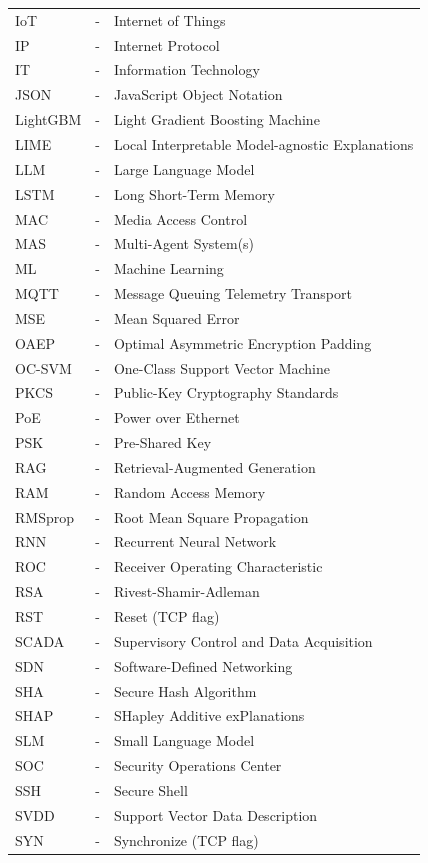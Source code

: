 \begin{longtable}{lcl}
IoT	& - & Internet of Things\\
IP	& - & Internet Protocol\\
IT	& - & Information Technology\\
JSON	& - & JavaScript Object Notation\\
LightGBM	& - & Light Gradient Boosting Machine\\
LIME	& - & Local Interpretable Model-agnostic Explanations\\
LLM	& - & Large Language Model\\
LSTM	& - & Long Short-Term Memory\\
MAC	& - & Media Access Control\\
MAS	& - & Multi-Agent System(s)\\
ML	& - & Machine Learning\\
MQTT	& - & Message Queuing Telemetry Transport\\
MSE	& - & Mean Squared Error\\
OAEP	& - & Optimal Asymmetric Encryption Padding\\
OC-SVM	& - & One-Class Support Vector Machine\\
PKCS	& - & Public-Key Cryptography Standards\\
PoE	& - & Power over Ethernet\\
PSK	& - & Pre-Shared Key\\
RAG	& - & Retrieval-Augmented Generation\\
RAM	& - & Random Access Memory\\
RMSprop	& - & Root Mean Square Propagation\\
RNN	& - & Recurrent Neural Network\\
ROC	& - & Receiver Operating Characteristic\\
RSA	& - & Rivest-Shamir-Adleman\\
RST	& - & Reset (TCP flag)\\
SCADA	& - & Supervisory Control and Data Acquisition\\
SDN	& - & Software-Defined Networking\\
SHA	& - & Secure Hash Algorithm\\
SHAP	& - & SHapley Additive exPlanations\\
SLM	& - & Small Language Model\\
SOC	& - & Security Operations Center\\
SSH	& - & Secure Shell\\
SVDD	& - & Support Vector Data Description\\
SYN	& - & Synchronize (TCP flag)\\

\end{longtable}
